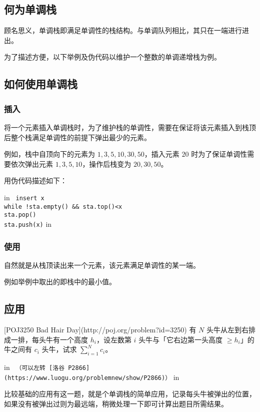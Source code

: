
\subsection{何为单调栈}

顾名思义，单调栈即满足单调性的栈结构。与单调队列相比，其只在一端进行进出。

为了描述方便，以下举例及伪代码以维护一个整数的单调递增栈为例。

\subsection{如何使用单调栈}

\subsubsection{插入}

将一个元素插入单调栈时，为了维护栈的单调性，需要在保证将该元素插入到栈顶后整个栈满足单调性的前提下弹出最少的元素。

例如，栈中自顶向下的元素为 ${1,3,5,10,30,50}$，插入元素 $20$ 时为了保证单调性需要依次弹出元素 $1,3,5,10$，操作后栈变为 $20,30,50$。

用伪代码描述如下：

 in
\texttt{
insert x\\while !sta.empty() && sta.top()<x\\    sta.pop()\\sta.push(x)}
 in

\subsubsection{使用}

自然就是从栈顶读出来一个元素，该元素满足单调性的某一端。

例如举例中取出的即栈中的最小值。

\subsection{应用}

\begin{NOTE}{[POJ3250 Bad Hair Day](http://poj.org/problem?id=3250)}{}
有 $N$ 头牛从左到右排成一排，每头牛有一个高度 $h_i$，设左数第 $i$ 头牛与「它右边第一头高度 $≥h_i$」的牛之间有 $c_i$ 头牛，试求 $\sum_{i=1}^{N} c_i$。
\end{NOTE}


 in
\texttt{
（可以左转 [洛谷 P2866](https://www.luogu.org/problemnew/show/P2866)）}
 in

比较基础的应用有这一题，就是个单调栈的简单应用，记录每头牛被弹出的位置，如果没有被弹出过则为最远端，稍微处理一下即可计算出题目所需结果。
